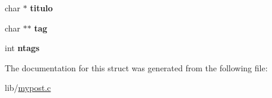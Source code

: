 \begin{DoxyCompactItemize}
\item 
char $\ast$ {\bfseries titulo}\hypertarget{structpost_a764ef7488fb345703e92a61a481e8e1e}{}\label{structpost_a764ef7488fb345703e92a61a481e8e1e}

\item 
char $\ast$$\ast$ {\bfseries tag}\hypertarget{structpost_ad95ce577bbdd8eb4ce98b19aab132a5e}{}\label{structpost_ad95ce577bbdd8eb4ce98b19aab132a5e}

\item 
int {\bfseries ntags}\hypertarget{structpost_a972de5ddae5ca5f2e60f08bbfb606f57}{}\label{structpost_a972de5ddae5ca5f2e60f08bbfb606f57}

\end{DoxyCompactItemize}


The documentation for this struct was generated from the following file\+:\begin{DoxyCompactItemize}
\item 
lib/\hyperlink{mypost_8c}{mypost.\+c}\end{DoxyCompactItemize}
